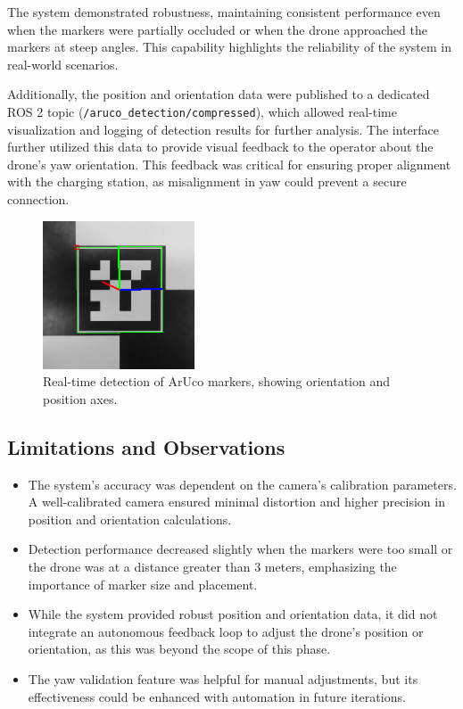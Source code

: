 The system demonstrated robustness, maintaining consistent performance even when the markers were partially occluded or when the drone approached the markers at steep angles. This capability highlights the reliability of the system in real-world scenarios.

Additionally, the position and orientation data were published to a dedicated ROS 2 topic (\texttt{/aruco\_detection/compressed}), which allowed real-time visualization and logging of detection results for further analysis. The interface further utilized this data to provide visual feedback to the operator about the drone's yaw orientation. This feedback was critical for ensuring proper alignment with the charging station, as misalignment in yaw could prevent a secure connection.

\begin{figure}[H]
    \centering
    \includegraphics[width=0.4\textwidth]{pictures/aruco_detection.png}
    \caption{Real-time detection of ArUco markers, showing orientation and position axes.}
    \label{fig:aruco_detection_results}
\end{figure}

\subsection{Limitations and Observations}
\begin{itemize}
    \item The system's accuracy was dependent on the camera's calibration parameters. A well-calibrated camera ensured minimal distortion and higher precision in position and orientation calculations.
    \item Detection performance decreased slightly when the markers were too small or the drone was at a distance greater than 3 meters, emphasizing the importance of marker size and placement.
    \item While the system provided robust position and orientation data, it did not integrate an autonomous feedback loop to adjust the drone's position or orientation, as this was beyond the scope of this phase.
    \item The yaw validation feature was helpful for manual adjustments, but its effectiveness could be enhanced with automation in future iterations.
\end{itemize}

